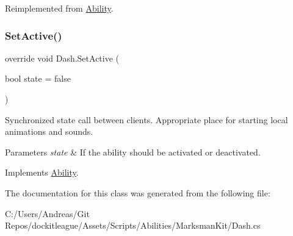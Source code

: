 Reimplemented from \hyperlink{class_ability_ae659b58f49f07191c1d269fc3ba59c7e}{Ability}.

\hypertarget{class_dash_a8eae582cfefa94fe254aeaca07d55674}{}\label{class_dash_a8eae582cfefa94fe254aeaca07d55674} 
\subsubsection{\texorpdfstring{Set\+Active()}{SetActive()}}
{\footnotesize\ttfamily override void Dash.\+Set\+Active (\begin{DoxyParamCaption}\item[{bool}]{state = {\ttfamily false} }\end{DoxyParamCaption})\hspace{0.3cm}{\ttfamily [virtual]}}



Synchronized state call between clients. Appropriate place for starting local animations and sounds. 


\begin{DoxyParams}{Parameters}
{\em state} & If the ability should be activated or deactivated.\\
\hline
\end{DoxyParams}


Implements \hyperlink{class_ability_a10f7f3c2b63eeef6e352aee48d246384}{Ability}.



The documentation for this class was generated from the following file\+:\begin{DoxyCompactItemize}
\item 
C\+:/\+Users/\+Andreas/\+Git Repos/dockitleague/\+Assets/\+Scripts/\+Abilities/\+Marksman\+Kit/Dash.\+cs\end{DoxyCompactItemize}
